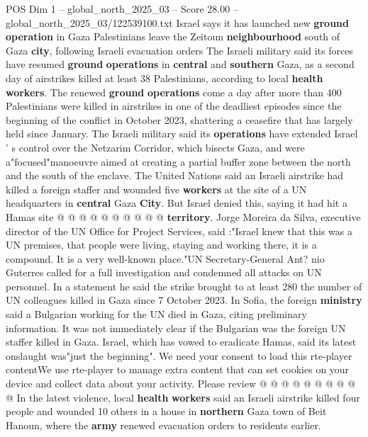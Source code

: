 \begin{textsample}{POS Dim 1 – global\_north\_2025\_03 – Score 28.00 – global\_north\_2025\_03/122539100.txt}  \label{ex:f1_pos_399}
Israel says it has launched new \textbf{ground} \textbf{operation} in Gaza Palestinians leave the Zeitoun \textbf{neighbourhood} south of Gaza \textbf{city}, following Israeli evacuation orders The Israeli military said its forces have resumed \textbf{ground} \textbf{operations} in \textbf{central} and \textbf{southern} Gaza, as a second day of airstrikes killed at least 38 Palestinians, according to local \textbf{health} \textbf{workers}.
The renewed \textbf{ground} \textbf{operations} come a day after more than 400 Palestinians were killed in airstrikes in one of the deadliest episodes since the beginning of the conflict in October 2023, shattering a ceasefire that has largely held since January.
The Israeli military said its \textbf{operations} have extended Israel ' s control over the Netzarim Corridor, which bisects Gaza, and were a"focused"manoeuvre aimed at creating a partial buffer zone between the north and the south of the enclave.
The United Nations said an Israeli airstrike had killed a foreign staffer and wounded five \textbf{workers} at the site of a UN headquarters in \textbf{central} Gaza \textbf{City}.
But Israel denied this, saying it had hit a Hamas site @ @ @ @ @ @ @ @ @ @ \textbf{territory}.
Jorge Moreira da Silva, executive director of the UN Office for Project Services, said :"Israel knew that this was a UN premises, that people were living, staying and working there, it is a compound.
It is a very well-known place."UN Secretary-General Ant? nio Guterres called for a full investigation and condemned all attacks on UN personnel.
In a statement he said the strike brought to at least 280 the number of UN colleagues killed in Gaza since 7 October 2023.
In Sofia, the foreign \textbf{ministry} said a Bulgarian working for the UN died in Gaza, citing preliminary information.
It was not immediately clear if the Bulgarian was the foreign UN staffer killed in Gaza.
Israel, which has vowed to eradicate Hamas, said its latest onslaught was"just the beginning".
We need your consent to load this rte-player contentWe use rte-player to manage extra content that can set cookies on your device and collect data about your activity.
Please review @ @ @ @ @ @ @ @ @ @ In the latest violence, local \textbf{health} \textbf{workers} said an Israeli airstrike killed four people and wounded 10 others in a house in \textbf{northern} Gaza town of Beit Hanoun, where the \textbf{army} renewed evacuation orders to residents earlier.

\end{textsample}
